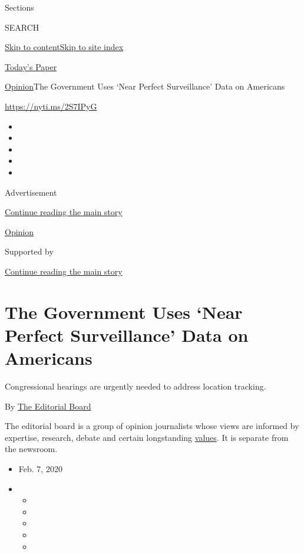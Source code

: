 Sections

SEARCH

\protect\hyperlink{site-content}{Skip to
content}\protect\hyperlink{site-index}{Skip to site index}

\href{https://myaccount.nytimes.com/auth/login?response_type=cookie\&client_id=vi}{}

\href{https://www.nytimes.com/section/todayspaper}{Today's Paper}

\href{/section/opinion}{Opinion}\textbar{}The Government Uses `Near
Perfect Surveillance' Data on Americans

\url{https://nyti.ms/2S7IPyG}

\begin{itemize}
\item
\item
\item
\item
\item
\end{itemize}

Advertisement

\protect\hyperlink{after-top}{Continue reading the main story}

\href{/section/opinion}{Opinion}

Supported by

\protect\hyperlink{after-sponsor}{Continue reading the main story}

\hypertarget{the-government-uses-near-perfect-surveillance-data-on-americans}{%
\section{The Government Uses `Near Perfect Surveillance' Data on
Americans}\label{the-government-uses-near-perfect-surveillance-data-on-americans}}

Congressional hearings are urgently needed to address location tracking.

By
\href{https://www.nytimes.com/interactive/opinion/editorialboard.html}{The
Editorial Board}

The editorial board is a group of opinion journalists whose views are
informed by expertise, research, debate and certain longstanding
\href{https://www.nytimes.com/interactive/2018/opinion/editorialboard.html}{values}.
It is separate from the newsroom.

\begin{itemize}
\item
  Feb. 7, 2020
\item
  \begin{itemize}
  \item
  \item
  \item
  \item
  \item
  \end{itemize}
\end{itemize}

